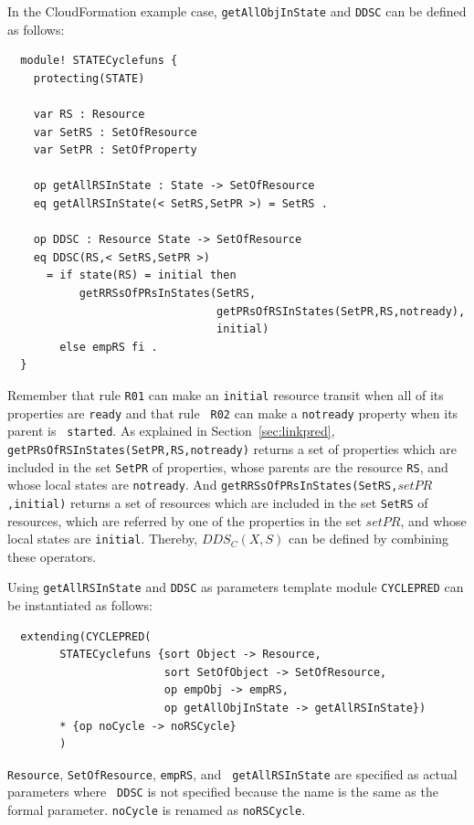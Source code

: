 \documentclass[12pt]{report}
\newcommand{\stt}[1]{{\small{\tt {#1}}}}
\begin{document}
In the CloudFormation example case, {\tt getAllObjInState} and {\tt DDSC} can be defined as
follows:
\small
\begin{verbatim}
  module! STATECyclefuns {
    protecting(STATE)
  
    var RS : Resource
    var SetRS : SetOfResource
    var SetPR : SetOfProperty
  
    op getAllRSInState : State -> SetOfResource
    eq getAllRSInState(< SetRS,SetPR >) = SetRS .
  
    op DDSC : Resource State -> SetOfResource
    eq DDSC(RS,< SetRS,SetPR >)
      = if state(RS) = initial then
           getRRSsOfPRsInStates(SetRS,
                                getPRsOfRSInStates(SetPR,RS,notready),
                                initial)
        else empRS fi .
  }
\end{verbatim}
\normalsize
Remember that rule {\tt R01} can make an {\tt initial} resource
transit when all of its properties are {\tt ready} and that rule {\tt
  R02} can make a {\tt notready} property when its parent is {\tt
  started}. As explained in Section~\ref{sec:linkpred},
\stt{getPRsOfRSInStates(SetPR,RS,notready)} returns a set of
properties which are included in the set {\tt SetPR} of properties,
whose parents are the resource {\tt RS}, and whose local states are
{\tt notready}. And \stt{getRRSsOfPRsInStates(SetRS,$setPR$,initial)}
returns a set of resources which are included in the set
{\tt SetRS} of resources, which are referred by one of the properties in the set $setPR$,
and whose local states are {\tt initial}. Thereby, $DDS\!_C(X,S)$ can be
defined by combining these operators.

Using {\tt getAllRSInState} and {\tt DDSC} as parameters template
module {\tt CYCLEPRED} can be instantiated as follows:
\small
\begin{verbatim}
  extending(CYCLEPRED(
        STATECyclefuns {sort Object -> Resource,
                        sort SetOfObject -> SetOfResource,
                        op empObj -> empRS,
                        op getAllObjInState -> getAllRSInState})
        * {op noCycle -> noRSCycle}
        )
\end{verbatim}
\normalsize
 {\tt Resource}, {\tt SetOfResource}, {\tt empRS}, and {\tt
   getAllRSInState} are specified as actual parameters where {\tt
   DDSC} is not specified because the name is the same as the formal
 parameter.  {\tt noCycle} is renamed as {\tt noRSCycle}.
\end{document}
